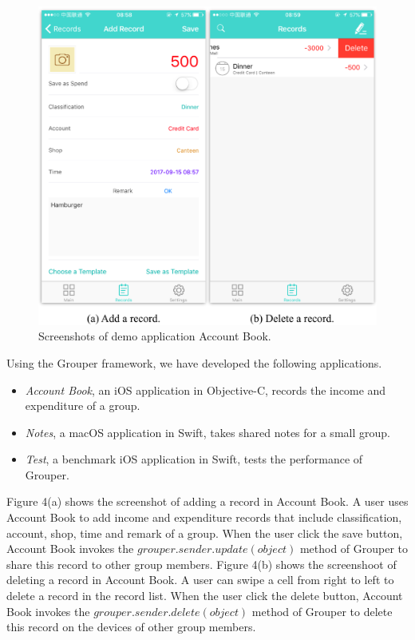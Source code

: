 \documentclass[twocolumn,10pt]{article}
\begin{document}
\begin{figure}[t]
	\centering
	\includegraphics[scale=0.5]{account_book}
	\caption{Screenshots of demo application Account Book.}
\end{figure}

Using the Grouper framework, we have developed the following applications. 

\begin{itemize}
	\setlength{\itemsep}{1pt}
	\setlength{\parskip}{0pt}
	\setlength{\parsep}{0pt}
	\item \emph{Account Book}, an iOS application in Objective-C, records the income and expenditure of a group.
	\item \emph{Notes}, a macOS application in Swift, takes shared notes for a small group.
	\item \emph{Test}, a benchmark iOS application in Swift, tests the performance of Grouper.
\end{itemize}

Figure 4(a) shows the screenshot of adding a record in Account Book. 
A user uses Account Book to add income and expenditure records that include classification, account, shop, time and remark of a group. 
When the user click the save button, Account Book invokes the $grouper.sender.update(object)$ method of Grouper to share this record to other group members.
Figure 4(b) shows the screenshoot of deleting a record in Account Book. 
A user can swipe a cell from right to left to delete a record in the record list. 
When the user click the delete button, Account Book invokes the $grouper.sender.delete(object)$ method of Grouper to delete this record on the devices of other group members.
\end{document}
